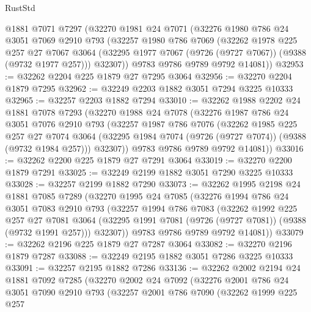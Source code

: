 \begin{lexlean}{RustStd}
\begin{coremodule}
    @1881
    @7071
    @7297
    (@32270
      @1981
      @24
      @7071
      (@32276
        @1980
        @786
        @24
        @3051
        @7069
        @2910
        @793
        (@32257
          @1980
          @786
          @7069
          (@32262
            @1978
            @225
            @257
            @27
            @7067
            @3064
            (@32295 @1977 @7067 (@9726 (@9727 @7067)) (@9388 (@9732 @1977 @257)))
            @32307))
        @9783
        @9786
        @9789
        @9792
        @14081))
@32953 := @32262 @2204 @225 @1879 @27 @7295 @3064
@32956 := @32270 @2204 @1879 @7295
@32962 := @32249 @2203 @1882 @3051 @7294 @3225 @10333
@32965 := @32257 @2203 @1882 @7294
@33010 := @32262
    @1988
    @2202
    @24
    @1881
    @7078
    @7293
    (@32270
      @1988
      @24
      @7078
      (@32276
        @1987
        @786
        @24
        @3051
        @7076
        @2910
        @793
        (@32257
          @1987
          @786
          @7076
          (@32262
            @1985
            @225
            @257
            @27
            @7074
            @3064
            (@32295 @1984 @7074 (@9726 (@9727 @7074)) (@9388 (@9732 @1984 @257)))
            @32307))
        @9783
        @9786
        @9789
        @9792
        @14081))
@33016 := @32262 @2200 @225 @1879 @27 @7291 @3064
@33019 := @32270 @2200 @1879 @7291
@33025 := @32249 @2199 @1882 @3051 @7290 @3225 @10333
@33028 := @32257 @2199 @1882 @7290
@33073 := @32262
    @1995
    @2198
    @24
    @1881
    @7085
    @7289
    (@32270
      @1995
      @24
      @7085
      (@32276
        @1994
        @786
        @24
        @3051
        @7083
        @2910
        @793
        (@32257
          @1994
          @786
          @7083
          (@32262
            @1992
            @225
            @257
            @27
            @7081
            @3064
            (@32295 @1991 @7081 (@9726 (@9727 @7081)) (@9388 (@9732 @1991 @257)))
            @32307))
        @9783
        @9786
        @9789
        @9792
        @14081))
@33079 := @32262 @2196 @225 @1879 @27 @7287 @3064
@33082 := @32270 @2196 @1879 @7287
@33088 := @32249 @2195 @1882 @3051 @7286 @3225 @10333
@33091 := @32257 @2195 @1882 @7286
@33136 := @32262
    @2002
    @2194
    @24
    @1881
    @7092
    @7285
    (@32270
      @2002
      @24
      @7092
      (@32276
        @2001
        @786
        @24
        @3051
        @7090
        @2910
        @793
        (@32257
          @2001
          @786
          @7090
          (@32262
            @1999
            @225
            @257

\end{coremodule}
\end{lexlean}
